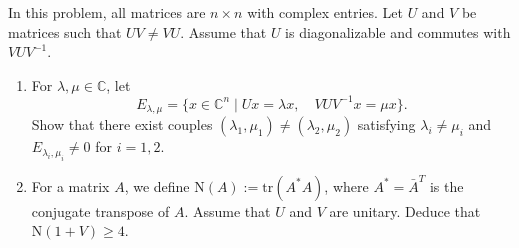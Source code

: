 \begin{exercise}
\label{algebra:2017:5}
In this problem, all matrices are $n \times n$ with complex entries. Let $U$ and $V$ be matrices such that $UV \neq VU$. Assume that $U$ is diagonalizable and commutes with $VUV^{-1}$.

\begin{enumerate}
\item For $\lambda, \mu \in \mathbb{C}$, let
\[E_{\lambda,\mu} = \{x \in \mathbb{C}^n \mid Ux = \lambda x, \quad VUV^{-1}x = \mu x\}.\]
Show that there exist couples $(\lambda_1, \mu_1) \neq (\lambda_2, \mu_2)$ satisfying $\lambda_i \neq \mu_i$ and $E_{\lambda_i, \mu_i} \neq 0$ for $i = 1, 2$.

\item For a matrix $A$, we define $\mathrm{N}(A) := \mathrm{tr}(A^*A)$, where $A^* = \bar{A}^T$ is the conjugate transpose of $A$. Assume that $U$ and $V$ are unitary. Deduce that $\mathrm{N}(1 + V) \geq 4$.
\end{enumerate}
\end{exercise}
